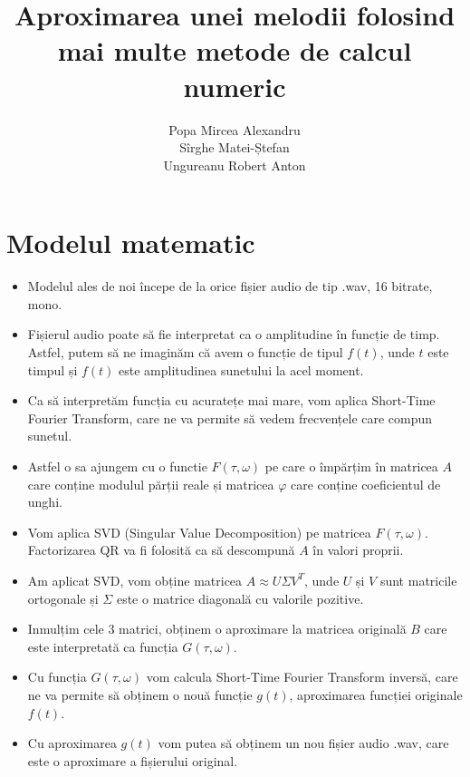 \documentclass[12pt]{article}
\begin{document}
\title{Aproximarea unei melodii folosind mai multe metode de calcul numeric}

\author{
  Popa Mircea Alexandru \\
  Sîrghe Matei-Ștefan \\ 
  Ungureanu Robert Anton
}

\maketitle

\section{Modelul matematic}\label{Modelul}
\begin{itemize}
\item Modelul ales de noi începe de la orice fișier audio de tip .wav, 16 bitrate, mono.\\
\item Fișierul audio poate să fie interpretat ca o amplitudine în funcție de timp. Astfel, putem să ne imaginăm că avem o funcție de tipul $f(t)$, unde $t$ este timpul și $f(t)$ este amplitudinea sunetului la acel moment.\\
\item Ca să interpretăm funcția cu acuratețe mai mare, vom aplica Short-Time Fourier Transform, care ne va permite să vedem frecvențele care compun sunetul.\\
\item Astfel o sa ajungem cu o functie $F(\tau,\omega)$ pe care o împărțim în matricea $A$ care conține modulul părții reale și matricea $\varphi$ care conține coeficientul de unghi. \\
\item Vom aplica SVD (Singular Value Decomposition) pe matricea $F(\tau,\omega)$. Factorizarea QR va fi folosită  ca să descompună $A$ în valori proprii.\\
\item Am aplicat SVD, vom obține matricea $A \approx U \Sigma V^T$, unde $U$ și $V$ sunt matricile ortogonale și $\Sigma$ este o matrice diagonală cu valorile pozitive.\\
\item Inmulțim cele 3 matrici, obținem o aproximare la matricea originală $B$ care este interpretată ca funcția $G(\tau,\omega)$. \\ 
\item Cu funcția $G(\tau,\omega)$ vom calcula Short-Time Fourier Transform inversă, care ne va permite să obținem o nouă funcție $g(t)$, aproximarea funcției originale $f(t)$.\\
\item Cu aproximarea $g(t)$ vom putea să obținem un nou fișier audio .wav, care este o aproximare a fișierului original.\\
\end{itemize}
\end{document}
